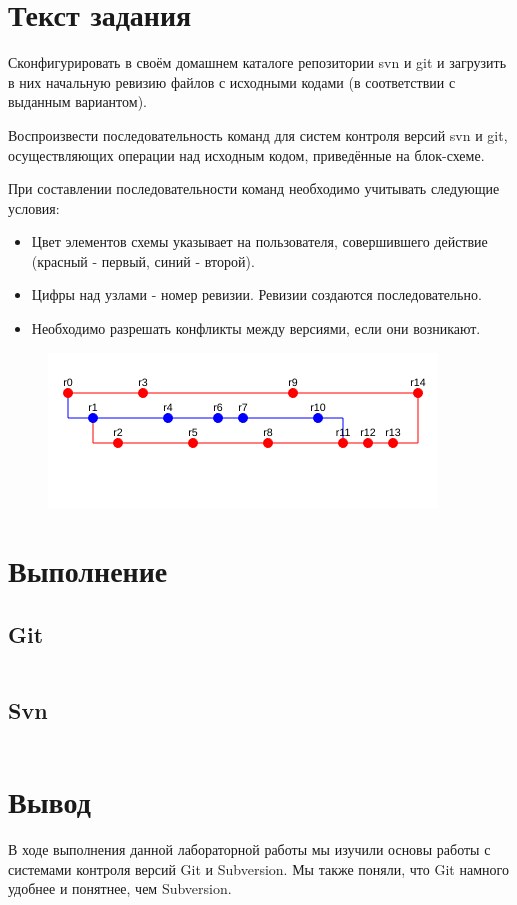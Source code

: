 \section{Текст задания}
Сконфигурировать в своём домашнем каталоге репозитории svn и git и
загрузить в них начальную ревизию файлов с исходными кодами (в соответствии с выданным вариантом).

Воспроизвести последовательность команд для систем контроля версий svn и git,
осуществляющих операции над исходным кодом, приведённые на блок-схеме.

При составлении последовательности команд необходимо учитывать следующие условия:

\begin{itemize}
  \item Цвет элементов схемы указывает на пользователя, совершившего действие (красный - первый, синий - второй).
  \item Цифры над узлами - номер ревизии. Ревизии создаются последовательно.
  \item Необходимо разрешать конфликты между версиями, если они возникают.
\end{itemize}

\begin{figure}[H]
\centering
\includegraphics{./img/task.png}
\end{figure}

\section{Выполнение}
\subsection{Git}
\inputminted[breaklines]{bash}{../git.sh}
\subsection{Svn}
\inputminted[breaklines]{bash}{../svn.sh}

\section{Вывод}
В ходе выполнения данной лабораторной работы мы изучили
основы работы с системами контроля версий Git и Subversion.
Мы также поняли, что Git намного удобнее и понятнее, чем Subversion.
